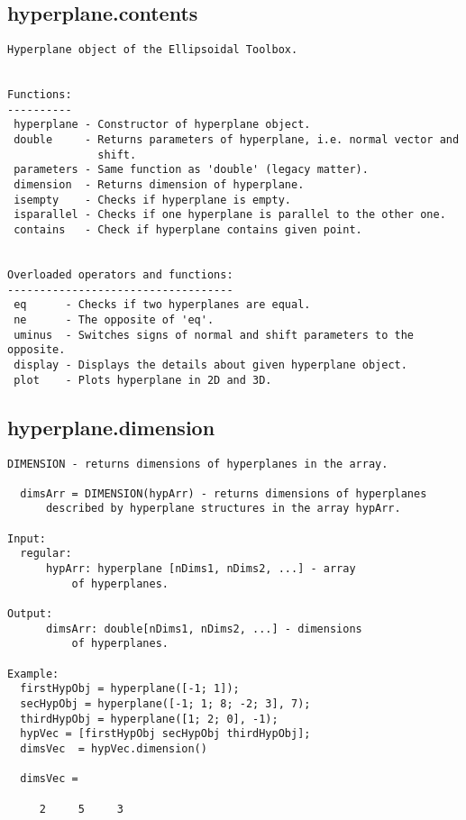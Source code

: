 \subsection{\texorpdfstring{hyperplane.contents}{contents}}\label{method:hyperplane.contents}
\begin{verbatim}
Hyperplane object of the Ellipsoidal Toolbox.


Functions:
----------
 hyperplane - Constructor of hyperplane object.
 double     - Returns parameters of hyperplane, i.e. normal vector and
              shift.
 parameters - Same function as 'double' (legacy matter).
 dimension  - Returns dimension of hyperplane.
 isempty    - Checks if hyperplane is empty.
 isparallel - Checks if one hyperplane is parallel to the other one.
 contains   - Check if hyperplane contains given point.


Overloaded operators and functions:
-----------------------------------
 eq      - Checks if two hyperplanes are equal.
 ne      - The opposite of 'eq'.
 uminus  - Switches signs of normal and shift parameters to the opposite.
 display - Displays the details about given hyperplane object.
 plot    - Plots hyperplane in 2D and 3D.
\end{verbatim}
\subsection{\texorpdfstring{hyperplane.dimension}{dimension}}\label{method:hyperplane.dimension}
\begin{verbatim}
DIMENSION - returns dimensions of hyperplanes in the array.

  dimsArr = DIMENSION(hypArr) - returns dimensions of hyperplanes
      described by hyperplane structures in the array hypArr.

Input:
  regular:
      hypArr: hyperplane [nDims1, nDims2, ...] - array
          of hyperplanes.

Output:
      dimsArr: double[nDims1, nDims2, ...] - dimensions
          of hyperplanes.

Example:
  firstHypObj = hyperplane([-1; 1]);
  secHypObj = hyperplane([-1; 1; 8; -2; 3], 7);
  thirdHypObj = hyperplane([1; 2; 0], -1);
  hypVec = [firstHypObj secHypObj thirdHypObj];
  dimsVec  = hypVec.dimension()

  dimsVec =

     2     5     3
\end{verbatim}
